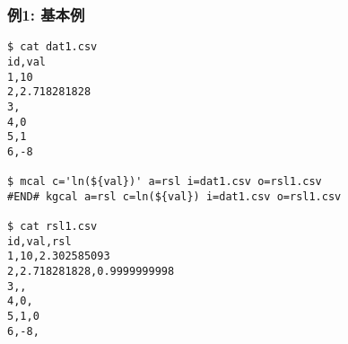 
\subsubsection*{例1: 基本例}


\begin{Verbatim}[baselinestretch=0.7,frame=single]
$ cat dat1.csv
id,val
1,10
2,2.718281828
3,
4,0
5,1
6,-8

$ mcal c='ln(${val})' a=rsl i=dat1.csv o=rsl1.csv
#END# kgcal a=rsl c=ln(${val}) i=dat1.csv o=rsl1.csv

$ cat rsl1.csv
id,val,rsl
1,10,2.302585093
2,2.718281828,0.9999999998
3,,
4,0,
5,1,0
6,-8,
\end{Verbatim}
